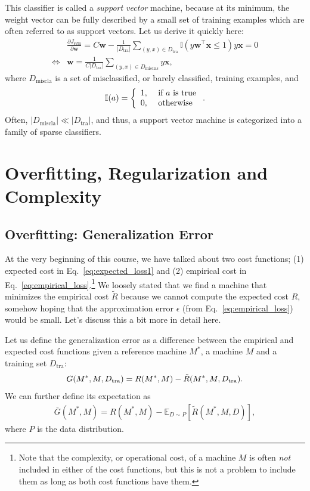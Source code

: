 \documentclass{report}
\newcommand{\vect}[1]{\mathbf{#1}}
\newcommand{\vx}[0]{\vect{x}}
\newcommand{\vw}[0]{\vect{w}}
\newcommand{\tra}{\text{tra}}
\begin{document}
This classifier is called a {\it support vector} machine, because at its
minimum, the weight vector can be fully described by a small set of training
examples which are often referred to as support vectors. Let us derive it
quickly here:
\begin{align*}
    &\frac{\partial J_{\text{svm}}}{\partial \vw} = 
    C \vw - \frac{1}{|D_{\tra}|} \sum_{(y, x) \in D_{\tra}} \mathbb{I}(y\vw^\top
    \vx \leq 1) y \vx = 0 \\
    \Leftrightarrow&
    \vw = \frac{1}{C|D_{\tra}|} \sum_{(y, x) \in D_{\text{misclas}}} y \vx,
\end{align*}
where $D_{\text{miscla}}$ is a set of misclassified, or barely classified,
training examples, and
\begin{align*}
    \mathbb{I}(a) = \left\{ 
        \begin{array}{l l}
            1,&\text{ if }a\text{ is true} \\
            0,&\text{ otherwise}
        \end{array}
        \right..
\end{align*} 
Often, $|D_{\text{miscla}}| \ll |D_{\tra}|$, and thus, a support vector machine
is categorized into a family of sparse classifiers.


\section{Overfitting, Regularization and Complexity}

\subsection{Overfitting: Generalization Error}

At the very beginning of this course, we have talked about two cost functions;
(1) expected cost in Eq.~\eqref{eq:expected_loss1} and (2) empirical cost in
Eq.~\eqref{eq:empirical_loss}.\footnote{
    Note that the complexity, or operational cost, of a machine $M$ is often
    {\it not} included in either of the cost functions, but this is not a
    problem to include them as long as both cost functions have them. 
} We loosely stated that we find a machine that minimizes the empirical cost
$\tilde{R}$ because we cannot compute the expected cost $R$, somehow hoping that
the approximation error $\epsilon$ (from Eq.~\eqref{eq:empirical_loss}) would be
small. Let's discuss this a bit more in detail here.

Let us define the generalization error as a difference between the empirical and
expected cost functions given a reference machine $M^*$, a machine $M$ and a
training set $D_{\tra}$:
\begin{align}
    \label{eq:generr}
    G(M^*, M, D_{\tra}) = R(M^*, M) - \tilde{R}(M^*, M, D_{\text{\tra}}).
\end{align}
We can further define its expectation as
\begin{align}
    \label{eq:generr_ee}
    \bar{G}(M^*, M) = R(M^*, M) - \mathbb{E}_{D \sim P} \left[\tilde{R}(M^*, M,
    D)\right],
\end{align}
where $P$ is the data distribution. 
\end{document}
